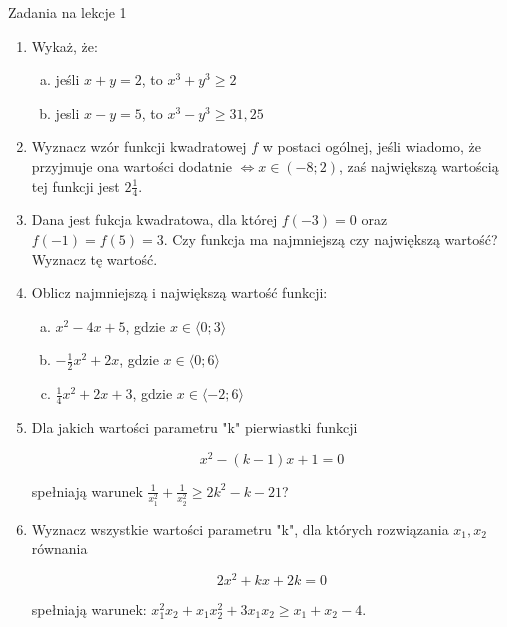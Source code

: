 \documentclass[12pt,a4paper]{article}
\begin{document}
	
	\begin{center}
		\LARGE Zadania na lekcje 1
	\end{center}
	\vspace{1.5cm}
	
	\begin{enumerate}[1.]
		\item Wykaż, że:
		
		\begin{enumerate}[a)]
			\item jeśli $x+y=2$, to $x^3+y^3\geq 2$
			\item jesli $x-y=5$, to $x^3-y^3\geq31,25$
		\end{enumerate}
	
	\item Wyznacz wzór funkcji kwadratowej $f$ w postaci ogólnej, jeśli wiadomo, że przyjmuje ona wartości dodatnie $\Leftrightarrow x\in (-8;2)$, zaś największą wartością tej funkcji jest $2\frac{1}{4}$.
	
	\item Dana jest fukcja kwadratowa, dla której $f(-3)=0$ oraz $f(-1)=f(5)=3$. Czy funkcja ma najmniejszą czy największą wartość? Wyznacz tę wartość.
	
	\item Oblicz najmniejszą i największą wartość funkcji:
	\begin{enumerate}[a)]
		\item $x^2-4x+5$, gdzie $x\in\langle0;3\rangle$
		\item $-\frac{1}{2}x^2+2x$, gdzie $x\in\langle0;6\rangle$
		\item $\frac{1}{4}x^2+2x+3$, gdzie $x\in\langle-2;6\rangle$
	\end{enumerate} 

	\item Dla jakich wartości parametru "k" pierwiastki funkcji
	
	$$x^2-(k-1)x + 1 = 0$$ 
	
	spełniają warunek $\frac{1}{x_1^2}+\frac{1}{x_2^2}\geq 2k^2-k-21$?
	
	\item Wyznacz wszystkie wartości parametru "k", dla których rozwiązania $x_1,x_2$ równania
	
	$$2x^2+kx+2k=0$$
	
	spełniają warunek: $x_1^2 x_2+x_1 x_2^2 + 3x_1x_2\geq x_1+x_2-4$.
		
	\end{enumerate}

	\newpage
	
\end{document}
